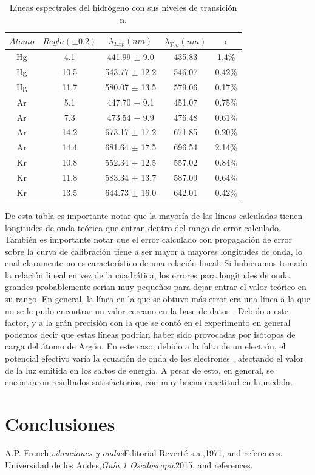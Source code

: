 \documentclass[%
 reprint,
 amsmath,amssymb,
 aps,
]{revtex4-1}
\begin{document}
\begin{table}[h!]
\centering
 \begin{tabular}{|c|c|c|c|c|} 
 \hline
 $Atomo$ & $Regla (\pm0.2) $ & $\lambda_{Exp} (nm)$ & $\lambda_{Teo} (nm)$ & $\epsilon$\\ [0.5ex] 
 \hline\hline
 Hg & 4.1  &	441.99 $\pm$ 9.0  & 435.83 & 1.4\% \\
 Hg & 10.5 &	543.77 $\pm$ 12.2 & 546.07 & 0.42\% \\
 Hg & 11.7 &	580.07 $\pm$ 13.5 & 579.06 & 0.17\% \\
 \hline
 Ar & 5.1  &447.70 $\pm$ 9.1  & 451.07 & 0.75\% \\
 Ar & 7.3  &473.54 $\pm$ 9.9  & 476.48 & 0.61\% \\
 Ar & 14.2 &673.17 $\pm$ 17.2 & 671.85 & 0.20\% \\
 Ar & 14.4 &	681.64 $\pm$ 17.5 & 696.54 & 2.14\% \\
 \hline
 Kr & 10.8 &	 552.34  $\pm$ 12.5 & 557.02 & 0.84\% \\
 Kr & 11.8 &	 583.34  $\pm$ 13.7 & 587.09 & 0.64\% \\
 Kr & 13.5 &	 644.73  $\pm$ 16.0 & 642.01 & 0.42\% \\
[1ex] 
 \hline
 \end{tabular}
 \caption{Líneas espectrales del hidrógeno con sus niveles de transición n.}
 \label{table:otros}
\end{table}

De esta tabla es importante notar que la mayoría de las líneas calculadas tienen longitudes de onda teórica que entran dentro del rango de error calculado. También es importante notar que el error calculado con propagación de error sobre la curva de calibración tiene a ser mayor a mayores longitudes de onda, lo cual claramente no es característico de una relación lineal. Si hubieramos tomado la relación lineal en vez de la cuadrática, los errores para longitudes de onda grandes probablemente serían muy pequeños para dejar entrar el valor teórico en su rango. En general, la línea en la que se obtuvo más error era una línea a la que no se le pudo encontrar un valor cercano en la base de datos \cite{base}. Debido a este factor, y a la grán precisión con la que se contó en el experimento en general podemos decir que estas líneas podrían haber sido provocadas por isótopos de carga del átomo de Argón. En este caso, debido a la falta de un electrón, el potencial efectivo varía la ecuación de onda de los electrones , afectando el valor de la luz emitida en los saltos de energía. A pesar de esto, en general, se encontraron resultados satisfactorios, con muy buena exactitud en la medida.\\




\section{\label{sec:level1}Conclusiones}
 


\begin{thebibliography}{99} 
 A.P. French,{\it vibraciones y ondas}{Editorial Reverté s.a.,1971}, and references.\\ 
 Universidad de los Andes,{\it Guía 1 Osciloscopio}{2015}, and references.\\ \end{thebibliography}
\end{document}
